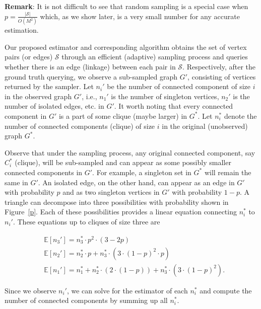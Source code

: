 \documentclass[aoas]{imsart}
\begin{document}
\textbf{Remark}: It is not difficult to see that random sampling is a special case when $p = \frac{|\mathcal{S}|}{O(M^2)}$ which, as we show later, is a very small number for any accurate estimation.

Our proposed estimator and corresponding algorithm obtains the set of vertex pairs (or edges) $\mathcal{S}$  through an efficient (adaptive) sampling process and queries whether there is an edge (linkage) between each pair in $\mathcal{S}$.  Respectively, after the ground truth querying, we observe a sub-sampled graph $G'$, consisting of vertices returned by the sampler. Let $n_i'$ be the number of connected component of size $i$ in the observed graph $G'$, i.e., $n_1'$ is the number of singleton vertices, $n_2'$ is the number of isolated edges, etc. in $G'$. It worth noting that every connected component in $G'$ is a part of some clique (maybe larger) in $G^*$.  Let $n_i^*$ denote the number of connected components (clique) of size $i$ in the original (unobserved) graph $G^*$.

Observe that under the sampling process, any original connected component, say $C_i^*$ (clique), will be sub-sampled and can appear as some possibly smaller connected components in $G'$. For example, a singleton set in $G^*$ will remain the same in $G'$. An isolated edge, on the other hand, can appear as an edge in $G'$ with probability $p$ and as two singleton vertices in $G'$ with probability $1-p$. A triangle can decompose into three possibilities with probability shown in Figure~\ref{p}. Each of these possibilities provides a linear equation connecting $n_i^*$ to $n_i'$. These equations up to cliques of size three are

\begin{align}
\label{n3}
&\mathbb{E}[n_3']= n_3^* \cdot p^2 \cdot (3-2p) \\
&\mathbb{E}[n_2'] = n_2^* \cdot p + n_3^*\cdot (3\cdot(1-p)^2\cdot p) \\
\label{n1}
&\mathbb{E}[n_1'] = n_1^* + n_2^* \cdot(2\cdot(1-p)) + n_3^* \cdot (3\cdot (1-p)^2).
\end{align}

Since we observe $n_i'$,  we can solve for the estimator of each $n_i^*$ and compute the number of connected components by summing up all $n_i^*$.
\end{document}
